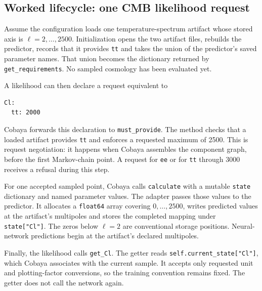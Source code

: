 \documentclass[10pt,aps,prd,twocolumn,nofootinbib]{revtex4-2}
\newcommand{\code}[1]{\texttt{#1}}
\begin{document}
\subsection{Worked lifecycle: one CMB likelihood request}

Assume the configuration loads one temperature-spectrum artifact whose stored
axis is $\ell=2,\ldots,2500$.  Initialization opens the two artifact files,
rebuilds the predictor, records that it provides \code{tt} and takes the
union of the predictor's saved parameter names.  That union becomes the
dictionary returned by \code{get\_requirements}.  No sampled cosmology has
been evaluated yet.

A likelihood can then declare a request equivalent to
\begin{verbatim}
Cl:
  tt: 2000
\end{verbatim}
Cobaya forwards this declaration to \code{must\_provide}.  The method checks
that a loaded artifact provides \code{tt} and enforces a requested maximum of
2500.  This is request negotiation: it happens when Cobaya assembles
the component graph, before the first Markov-chain point.  A request for
\code{ee} or for \code{tt} through 3000 receives a refusal during this step.

For one accepted sampled point, Cobaya calls \code{calculate} with a mutable
\code{state} dictionary and named parameter values.  The adapter passes those
values to the predictor.  It allocates a \code{float64} array covering
$0,\ldots,2500$, writes predicted values at the artifact's multipoles and
stores the completed mapping under \code{state["Cl"]}.  The zeros below
$\ell=2$ are conventional storage positions.  Neural-network predictions begin
at the artifact's declared multipoles.

Finally, the likelihood calls \code{get\_Cl}.  The getter reads
\code{self.current\_state["Cl"]}, which Cobaya associates with the current
sample.  It accepts only requested unit and plotting-factor conversions, so
the training convention remains fixed.  The getter does not call the network
again.
\end{document}
